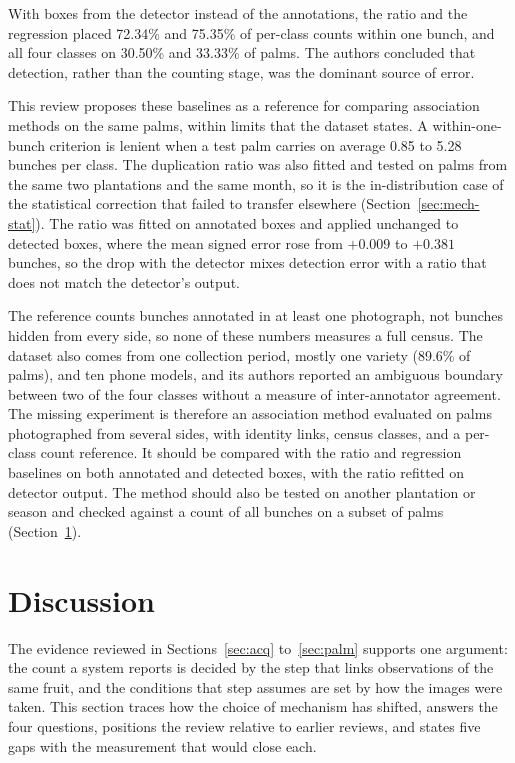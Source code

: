With boxes from the detector instead of the annotations, the ratio and the regression placed 72.34\% and 75.35\% of per-class counts within one bunch, and all four classes on 30.50\% and 33.33\% of palms. The authors concluded that detection, rather than the counting stage, was the dominant source of error.

This review proposes these baselines as a reference for comparing association methods on the same palms, within limits that the dataset states. A within-one-bunch criterion is lenient when a test palm carries on average 0.85 to 5.28 bunches per class. The duplication ratio was also fitted and tested on palms from the same two plantations and the same month, so it is the in-distribution case of the statistical correction that failed to transfer elsewhere (Section~\ref{sec:mech-stat}). The ratio was fitted on annotated boxes and applied unchanged to detected boxes, where the mean signed error rose from $+0.009$ to $+0.381$ bunches, so the drop with the detector mixes detection error with a ratio that does not match the detector's output.

The reference counts bunches annotated in at least one photograph, not bunches hidden from every side, so none of these numbers measures a full census. The dataset also comes from one collection period, mostly one variety (89.6\% of palms), and ten phone models, and its authors reported an ambiguous boundary between two of the four classes without a measure of inter-annotator agreement. The missing experiment is therefore an association method evaluated on palms photographed from several sides, with identity links, census classes, and a per-class count reference. It should be compared with the ratio and regression baselines on both annotated and detected boxes, with the ratio refitted on detector output. The method should also be tested on another plantation or season and checked against a count of all bunches on a subset of palms (Section~\ref{sec:agenda}).

\section{Discussion}\label{sec:agenda}

The evidence reviewed in Sections~\ref{sec:acq} to~\ref{sec:palm} supports one argument: the count a system reports is decided by the step that links observations of the same fruit, and the conditions that step assumes are set by how the images were taken. This section traces how the choice of mechanism has shifted, answers the four questions, positions the review relative to earlier reviews, and states five gaps with the measurement that would close each.

